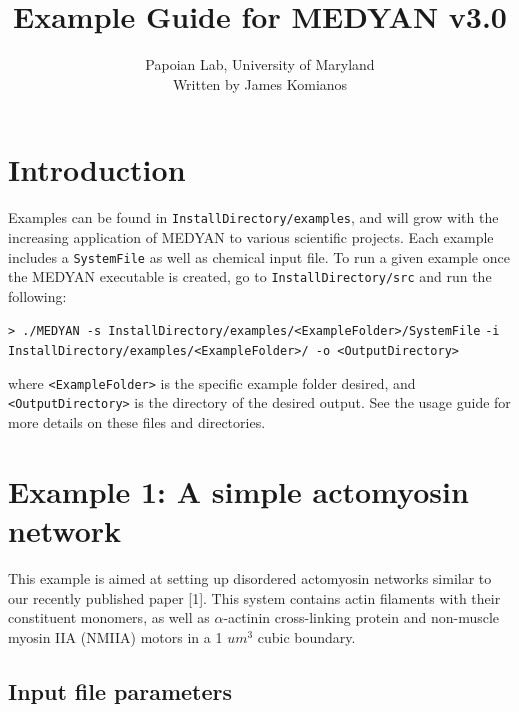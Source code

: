 \documentclass[11pt, oneside]{article}   	%
\title{Example Guide for MEDYAN v3.0}
\author{Papoian Lab, University of Maryland \\
	   Written by James Komianos}
\date{}							%
\begin{document}
\maketitle

\tableofcontents
\newpage

\section{Introduction}

Examples can be found in \texttt{InstallDirectory/examples}, and will grow with the increasing application of MEDYAN to various scientific projects. Each example includes a \texttt{SystemFile} as well as chemical input file. To run a given example once the MEDYAN executable is created, go to \texttt{InstallDirectory/src} and run the following:\newline

\indent \texttt{> ./MEDYAN -s InstallDirectory/examples/<ExampleFolder>/SystemFile}\newline
\indent\indent \texttt{-i InstallDirectory/examples/<ExampleFolder>/  -o <OutputDirectory>}\newline

\noindent where \texttt{<ExampleFolder>} is the specific example folder desired, and \texttt{<OutputDirectory>} is the directory of the desired output. See the usage guide for more details on these files and directories.

\section{Example 1: A simple actomyosin network}

This example is aimed at setting up disordered actomyosin networks similar to our recently published paper [1]. This system contains actin filaments with their constituent monomers, as well as $\alpha$-actinin cross-linking protein and non-muscle myosin IIA (NMIIA) motors in a 1 $um^3$ cubic boundary.

\subsection{Input file parameters}
\end{document}
